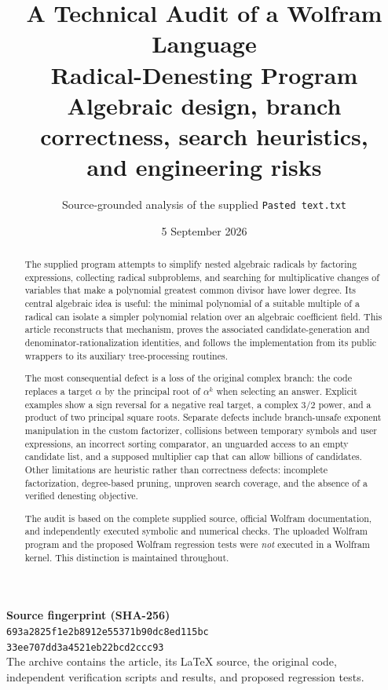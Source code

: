 \documentclass[11pt,letterpaper]{article}
\title{\vspace{-1.2em}\textbf{A Technical Audit of a Wolfram Language\\Radical-Denesting Program}\\[0.5em]
 \large Algebraic design, branch correctness, search heuristics,\\and engineering risks}
\author{Source-grounded analysis of the supplied \texttt{Pasted text.txt}}
\date{5 September 2026}
\theoremstyle{definition}
\begin{document}
\maketitle
\thispagestyle{empty}
\begin{abstract}
The supplied program attempts to simplify nested algebraic radicals by factoring
expressions, collecting radical subproblems, and searching for multiplicative
changes of variables that make a polynomial greatest common divisor have lower
degree. Its central algebraic idea is useful: the minimal polynomial of a suitable
multiple of a radical can isolate a simpler polynomial relation over an algebraic
coefficient field. This article reconstructs that mechanism, proves the associated
candidate-generation and denominator-rationalization identities, and follows the
implementation from its public wrappers to its auxiliary tree-processing routines.

The most consequential defect is a loss of the original complex branch: the code
replaces a target $\alpha$ by the principal root of $\alpha^k$ when selecting an
answer. Explicit examples show a sign reversal for a negative real target, a
complex $3/2$ power, and a product of two principal square roots. Separate defects
include branch-unsafe exponent manipulation in the custom factorizer, collisions
between temporary symbols and user expressions, an incorrect sorting comparator,
an unguarded access to an empty candidate list, and a supposed multiplier cap
that can allow billions of candidates. Other limitations are heuristic rather
than correctness defects: incomplete factorization, degree-based pruning,
unproven search coverage, and the absence of a verified denesting objective.

The audit is based on the complete supplied source, official Wolfram documentation,
and independently executed symbolic and numerical checks. The uploaded Wolfram
program and the proposed Wolfram regression tests were \emph{not} executed in a
Wolfram kernel. This distinction is maintained throughout.
\end{abstract}
\vfill
\begin{center}\small
\textbf{Source fingerprint (SHA-256)}\\[3pt]
\texttt{693a2825f1e2b8912e55371b90dc8ed115bc}\\
\texttt{33ee707dd3a4521eb22bcd2ccc93}\\[8pt]
The archive contains the article, its LaTeX source, the original code,\\
independent verification scripts and results, and proposed regression tests.
\end{center}
\newpage
\tableofcontents
\newpage
\end{document}
